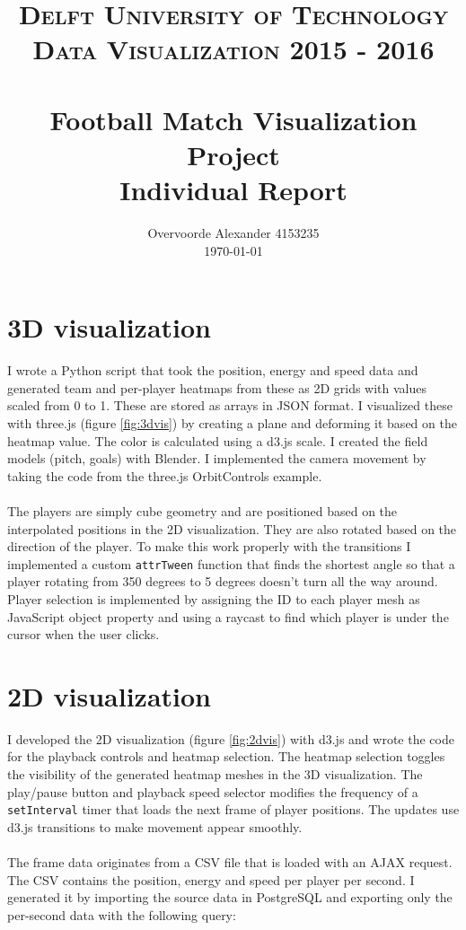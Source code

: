 \documentclass{article}
\title{ 	
		\usefont{OT1}{bch}{b}{n}
		\normalfont \normalsize \textsc{Delft University of Technology \protect\\ Data Visualization 2015 - 2016} \\ [25pt]
		\horrule{0.5pt} \\[0.4cm]
		\huge Football Match Visualization Project \\
		Individual Report
		\horrule{2pt} \\[0.5cm]
}
\author{
		\normalfont 								\normalsize
        Overvoorde Alexander 4153235\\[-3pt]		\normalsize
        \today
}
\date{}
\begin{document}
\lstset{language=sql}
\maketitle

\newpage
\section{3D visualization}

I wrote a Python script that took the position, energy and speed data and generated team and per-player heatmaps from these as 2D grids with values scaled from 0 to 1. These are stored as arrays in JSON format. I visualized these with three.js (figure \ref{fig:3dvis}) by creating a plane and deforming it based on the heatmap value. The color is calculated using a d3.js scale. I created the field models (pitch, goals) with Blender. I implemented the camera movement by taking the code from the three.js OrbitControls example.
\\ \\
The players are simply cube geometry and are positioned based on the interpolated positions in the 2D visualization. They are also rotated based on the direction of the player. To make this work properly with the transitions I implemented a custom \verb#attrTween# function that finds the shortest angle so that a player rotating from 350 degrees to 5 degrees doesn't turn all the way around.
\\
Player selection is implemented by assigning the ID to each player mesh as JavaScript object property and using a raycast to find which player is under the cursor when the user clicks.

\section{2D visualization}

I developed the 2D visualization (figure \ref{fig:2dvis}) with d3.js and wrote the code for the playback controls and heatmap selection. The heatmap selection toggles the visibility of the generated heatmap meshes in the 3D visualization. The play/pause button and playback speed selector modifies the frequency of a \verb#setInterval# timer that loads the next frame of player positions. The updates use d3.js transitions to make movement appear smoothly.
\\ \\
The frame data originates from a CSV file that is loaded with an AJAX request. The CSV contains the position, energy and speed per player per second. I generated it by importing the source data in PostgreSQL and exporting only the per-second data with the following query:
\end{document}
